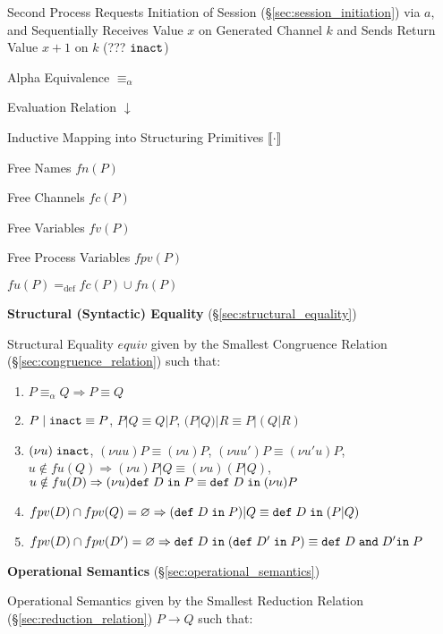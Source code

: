 Second Process Requests Initiation of Session
(\S\ref{sec:session_initiation}) via $a$, and Sequentially Receives
Value $x$ on Generated Channel $k$ and Sends Return Value $x + 1$ on
$k$ (??? $\mathtt{inact}$)

Alpha Equivalence $\equiv_\alpha$

Evaluation Relation $\downarrow$

Inductive Mapping into Structuring Primitives $\llbracket \cdot
\rrbracket$

Free Names $fn(P)$

Free Channels $fc(P)$

Free Variables $fv(P)$

Free Process Variables $fpv(P)$

$fu(P) =_{\text{def}} fc(P) \cup fn(P)$


\textbf{Structural (Syntactic) Equality}
(\S\ref{sec:structural_equality})
\cite{honda-vasconcelos-kubo98}

Structural Equality $equiv$ given by the Smallest Congruence Relation
(\S\ref{sec:congruence_relation}) such that:
\begin{enumerate}
  \item $P \equiv_\alpha Q \Rightarrow P \equiv Q$
  \item $P \;|\; \mathtt{inact} \equiv P$, \quad\quad $P | Q \equiv Q
    | P$, \quad\quad $(P|Q)|R \equiv P|(Q|R)$
  \item $(\nu u) \; \mathtt{inact}$, \quad
    $(\nu u u)P \equiv (\nu u)P$, \quad
    $(\nu u u')P \equiv (\nu u' u)P$, \\
    $u \notin fu(Q) \Rightarrow (\nu u)P | Q \equiv (\nu u)(P|Q)$, \\
    $u \notin fu(D) \Rightarrow
    (\nu u) \mathtt{def} \; D \; \mathtt{in} \; P
    \equiv \mathtt{def} \; D \; \mathtt{in} \; (\nu u)P$
  \item $fpv(D) \cap fpv(Q) = \varnothing \Rightarrow
    (\mathtt{def} \; D \; \mathtt{in} \; P) | Q
    \equiv \mathtt{def} \; D \; \mathtt{in} \; (P|Q)$
  \item $fpv(D) \cap fpv(D') = \varnothing \Rightarrow
    \mathtt{def} \; D \; \mathtt{in} \;
    (\mathtt{def} \; D' \; \mathtt{in} \; P)
    \equiv \mathtt{def} \; D \; \mathtt{and} \; D' \mathtt{in} \; P$
\end{enumerate}


\textbf{Operational Semantics} (\S\ref{sec:operational_semantics})
\cite{honda-vasconcelos-kubo98}

Operational Semantics given by the Smallest Reduction Relation
(\S\ref{sec:reduction_relation}) $P \rightarrow Q$ such that:

